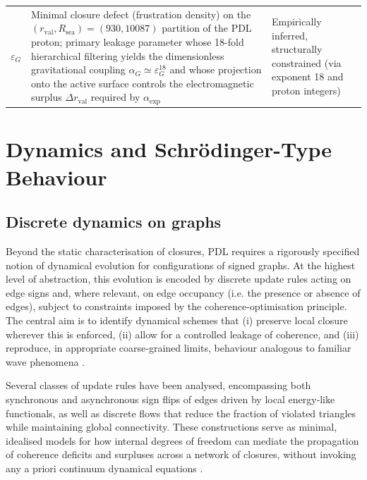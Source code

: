 \documentclass[11pt,a4paper]{article}
\begin{document}
\begin{longtable}{@{}L{1.5cm}L{7.3cm}L{4.2cm}p{1.8cm}@{}}
  $\varepsilon_G$ & 
  Minimal closure defect (frustration density) on the $(r_{\text{val}},R_{\text{sea}})=(930,10087)$ partition of the PDL proton; primary leakage parameter whose 18-fold hierarchical filtering yields the dimensionless gravitational coupling $\alpha_G \simeq \varepsilon_G^{18}$ and whose projection onto the active surface controls the electromagnetic surplus $\Delta r_{\text{val}}$ required by $\alpha_{\text{exp}}$ & Empirically inferred, structurally constrained (via exponent 18 and proton integers) & 
  \cite{Exponent_18_PDL_2026,Topological_Reformulation_PDL_2026,Universal_Coherence_Leakage_2026} \\[0.4em]

\end{longtable}

\section{Dynamics and Schr\"odinger-Type Behaviour}
\label{sec:dynamics}

\subsection{Discrete dynamics on graphs}
\label{subsec:discrete_dynamics}

Beyond the static characterisation of closures, PDL requires a rigorously specified notion of dynamical evolution for configurations of signed graphs. At the highest level of abstraction, this evolution is encoded by discrete update rules acting on edge signs and, where relevant, on edge occupancy (i.e. the presence or absence of edges), subject to constraints imposed by the coherence‑optimisation principle. The central aim is to identify dynamical schemes that (i) preserve local closure wherever this is enforced, (ii) allow for a controlled leakage of coherence, and (iii) reproduce, in appropriate coarse‑grained limits, behaviour analogous to familiar wave phenomena \citep{PDL_Main_2026,PDL_position}.

Several classes of update rules have been analysed, encompassing both synchronous and asynchronous sign flips of edges driven by local energy‑like functionals, as well as discrete flows that reduce the fraction of violated triangles while maintaining global connectivity. These constructions serve as minimal, idealised models for how internal degrees of freedom can mediate the propagation of coherence deficits and surpluses across a network of closures, without invoking any a priori continuum dynamical equations \citep{Coherence_Leakage_18_2026}.
\end{document}
